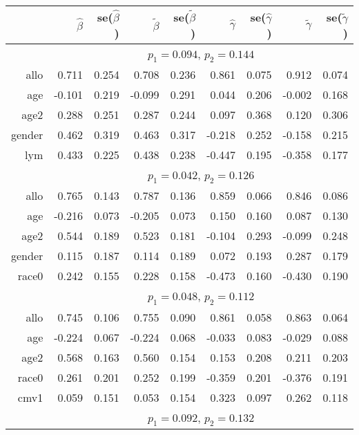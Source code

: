\documentclass[a4paper,10pt]{article}
\begin{document}
\begin{table}[ht]
  \centering
  \begin{tabular}{rrrrrrrrr}
    \toprule
    & $\widehat\beta$ & se($\widehat\beta$) & $\widetilde\beta$ & se($\widetilde\beta$) & 
                                                                                          $\widehat\gamma$ & se($\widehat\gamma$) & $\widetilde\gamma$ & se($\widetilde\gamma$) \\
    \midrule
    & \multicolumn{8}{c}{$p_1 = 0.094$, $p_2 = 0.144$}\\
    allo & 0.711 & 0.254 & 0.708 & 0.236 & 0.861 & 0.075 & 0.912 & 0.074 \\ 
    age & -0.101 & 0.219 & -0.099 & 0.291 & 0.044 & 0.206 & -0.002 & 0.168 \\ 
    age2 & 0.288 & 0.251 & 0.287 & 0.244 & 0.097 & 0.368 & 0.120 & 0.306 \\ 
    gender & 0.462 & 0.319 & 0.463 & 0.317 & -0.218 & 0.252 & -0.158 & 0.215 \\ 
    lym & 0.433 & 0.225 & 0.438 & 0.238 & -0.447 & 0.195 & -0.358 & 0.177 \\ 
    [1ex]
    & \multicolumn{8}{c}{$p_1 = 0.042$, $p_2 = 0.126$}\\
    allo & 0.765 & 0.143 & 0.787 & 0.136 & 0.859 & 0.066 & 0.846 & 0.086 \\ 
    age & -0.216 & 0.073 & -0.205 & 0.073 & 0.150 & 0.160 & 0.087 & 0.130 \\ 
    age2 & 0.544 & 0.189 & 0.523 & 0.181 & -0.104 & 0.293 & -0.099 & 0.248 \\ 
    gender & 0.115 & 0.187 & 0.114 & 0.189 & 0.072 & 0.193 & 0.287 & 0.179 \\ 
    race0 & 0.242 & 0.155 & 0.228 & 0.158 & -0.473 & 0.160 & -0.430 & 0.190 \\ 
    [1ex]
    & \multicolumn{8}{c}{$p_1 = 0.048$, $p_2 = 0.112$}\\
    allo & 0.745 & 0.106 & 0.755 & 0.090 & 0.861 & 0.058 & 0.863 & 0.064 \\ 
    age & -0.224 & 0.067 & -0.224 & 0.068 & -0.033 & 0.083 & -0.029 & 0.088 \\ 
    age2 & 0.568 & 0.163 & 0.560 & 0.154 & 0.153 & 0.208 & 0.211 & 0.203 \\ 
    race0 & 0.261 & 0.201 & 0.252 & 0.199 & -0.359 & 0.201 & -0.376 & 0.191 \\ 
    cmv1 & 0.059 & 0.151 & 0.053 & 0.154 & 0.323 & 0.097 & 0.262 & 0.118 \\ 
    [1ex]
    & \multicolumn{8}{c}{$p_1 = 0.092$, $p_2 = 0.132$}\\

\end{tabular}
\end{table}
\end{document}
